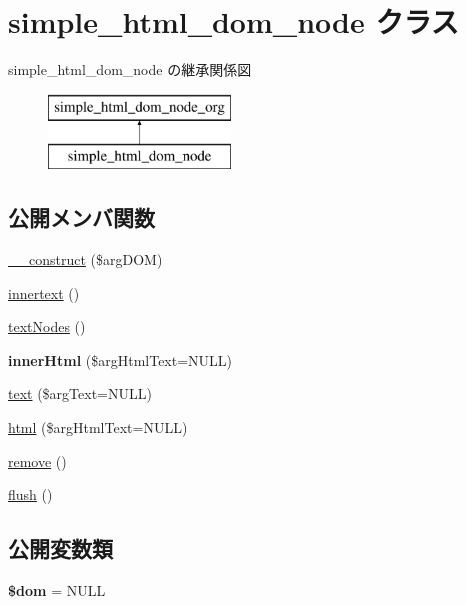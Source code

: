 \hypertarget{classsimple__html__dom__node}{}\section{simple\+\_\+html\+\_\+dom\+\_\+node クラス}
\label{classsimple__html__dom__node}
simple\+\_\+html\+\_\+dom\+\_\+node の継承関係図\begin{figure}[H]
\begin{center}
\leavevmode
\includegraphics[height=2.000000cm]{classsimple__html__dom__node}
\end{center}
\end{figure}
\subsection*{公開メンバ関数}
\begin{DoxyCompactItemize}
\item 
\hyperlink{classsimple__html__dom__node_a6621f9695c45433db31bef1ddfd1a535}{\+\_\+\+\_\+construct} (\$arg\+D\+O\+M)
\item 
\hyperlink{classsimple__html__dom__node_ace96ee90c681b5c31917f7e9a9919a7f}{innertext} ()
\item 
\hyperlink{classsimple__html__dom__node_a24c24d3a279bbd1ee2e0178769bc06d9}{text\+Nodes} ()
\item 
\hypertarget{classsimple__html__dom__node_a81f75da9128cc4871f5cf8b9d88692e5}{}{\bfseries inner\+Html} (\$arg\+Html\+Text=N\+U\+L\+L)\label{classsimple__html__dom__node_a81f75da9128cc4871f5cf8b9d88692e5}

\item 
\hyperlink{classsimple__html__dom__node_af5120c63522916ee49dafb6a1aaf4b05}{text} (\$arg\+Text=N\+U\+L\+L)
\item 
\hyperlink{classsimple__html__dom__node_a159886a895faf543997faa109c9ff47e}{html} (\$arg\+Html\+Text=N\+U\+L\+L)
\item 
\hyperlink{classsimple__html__dom__node_a967cce7d0454836545657324e19b8330}{remove} ()
\item 
\hyperlink{classsimple__html__dom__node_ab25d8c9e4434dbf6ead41c43dc1d8bca}{flush} ()
\end{DoxyCompactItemize}
\subsection*{公開変数類}
\begin{DoxyCompactItemize}
\item 
\hypertarget{classsimple__html__dom__node_afefb800a237264b8879e9fd537113448}{}{\bfseries \$dom} = N\+U\+L\+L\label{classsimple__html__dom__node_afefb800a237264b8879e9fd537113448}

\end{DoxyCompactItemize}


